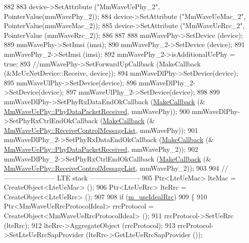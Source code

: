 \begin{DoxyCode}
882 
883         device->SetAttribute (\textcolor{stringliteral}{"MmWaveUePhy\_2"}, PointerValue(mmWavePhy\_2));
884         device->SetAttribute (\textcolor{stringliteral}{"MmWaveUeMac\_2"}, PointerValue(mmWaveMac\_2));
885         device->SetAttribute (\textcolor{stringliteral}{"MmWaveUeRrc\_2"}, PointerValue (mmWaveRrc\_2));
886 
887 
888         mmWavePhy->SetDevice (device);
889         mmWavePhy->SetImsi (imsi);
890         mmWavePhy\_2->SetDevice (device);
891         mmWavePhy\_2->SetImsi (imsi);
892         mmWavePhy\_2->isAdditionalUePhy = \textcolor{keyword}{true};
893         \textcolor{comment}{//mmWavePhy->SetForwardUpCallback (MakeCallback (&McUeNetDevice::Receive, device));}
894         mmWaveDlPhy->SetDevice(device);
895         mmWaveUlPhy->SetDevice(device);
896         mmWaveDlPhy\_2->SetDevice(device);
897         mmWaveUlPhy\_2->SetDevice(device);
898 
899         mmWaveDlPhy->SetPhyRxDataEndOkCallback (\hyperlink{group__makecallbackmemptr_ga9376283685aa99d204048d6a4b7610a4}{MakeCallback} (&
      \hyperlink{classns3_1_1MmWaveUePhy_a439193d17fd93b179faa9db76f2b84af}{MmWaveUePhy::PhyDataPacketReceived}, mmWavePhy));
900         mmWaveDlPhy->SetPhyRxCtrlEndOkCallback (\hyperlink{group__makecallbackmemptr_ga9376283685aa99d204048d6a4b7610a4}{MakeCallback} (&
      \hyperlink{classns3_1_1MmWaveUePhy_a1c3001d74628f40e38c1b4a04eac5015}{MmWaveUePhy::ReceiveControlMessageList}, mmWavePhy));
901         mmWaveDlPhy\_2->SetPhyRxDataEndOkCallback (\hyperlink{group__makecallbackmemptr_ga9376283685aa99d204048d6a4b7610a4}{MakeCallback} (&
      \hyperlink{classns3_1_1MmWaveUePhy_a439193d17fd93b179faa9db76f2b84af}{MmWaveUePhy::PhyDataPacketReceived}, mmWavePhy\_2));
902         mmWaveDlPhy\_2->SetPhyRxCtrlEndOkCallback (\hyperlink{group__makecallbackmemptr_ga9376283685aa99d204048d6a4b7610a4}{MakeCallback} (&
      \hyperlink{classns3_1_1MmWaveUePhy_a1c3001d74628f40e38c1b4a04eac5015}{MmWaveUePhy::ReceiveControlMessageList}, mmWavePhy\_2));
903 
904         \textcolor{comment}{// ----------------------- LTE stack ----------------------}
905         Ptr<LteUeMac> lteMac = CreateObject<LteUeMac> ();
906         Ptr<LteUeRrc> lteRrc = CreateObject<LteUeRrc> ();
907 
908         \textcolor{keywordflow}{if} (\hyperlink{classns3_1_1MmWaveHelper_ad41fdb2996a6f53385b146bb60f476dc}{m\_useIdealRrc})
909         \{
910                 Ptr<MmWaveUeRrcProtocolIdeal> rrcProtocol = CreateObject<MmWaveUeRrcProtocolIdeal> ();
911                 rrcProtocol->SetUeRrc (lteRrc);
912                 lteRrc->AggregateObject (rrcProtocol);
913                 rrcProtocol->SetLteUeRrcSapProvider (lteRrc->GetLteUeRrcSapProvider ());

\end{DoxyCode}
